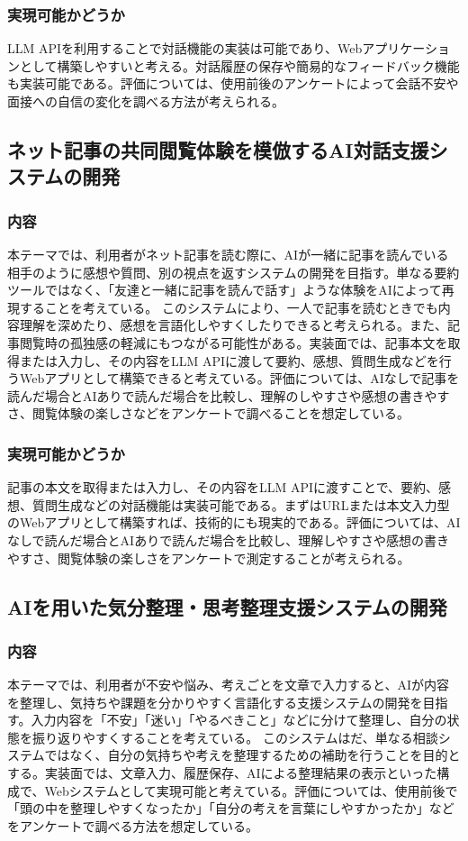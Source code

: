 \documentclass[a4paper,12pt]{ujarticle}
\begin{document}
\subsubsection{実現可能かどうか}
LLM APIを利用することで対話機能の実装は可能であり、Webアプリケーションとして構築しやすいと考える。対話履歴の保存や簡易的なフィードバック機能も実装可能である。評価については、使用前後のアンケートによって会話不安や面接への自信の変化を調べる方法が考えられる。

\subsection{ネット記事の共同閲覧体験を模倣するAI対話支援システムの開発}

\subsubsection{内容}

本テーマでは、利用者がネット記事を読む際に、AIが一緒に記事を読んでいる相手のように感想や質問、別の視点を返すシステムの開発を目指す。単なる要約ツールではなく、「友達と一緒に記事を読んで話す」ような体験をAIによって再現することを考えている。
このシステムにより、一人で記事を読むときでも内容理解を深めたり、感想を言語化しやすくしたりできると考えられる。また、記事閲覧時の孤独感の軽減にもつながる可能性がある。実装面では、記事本文を取得または入力し、その内容をLLM APIに渡して要約、感想、質問生成などを行うWebアプリとして構築できると考えている。評価については、AIなしで記事を読んだ場合とAIありで読んだ場合を比較し、理解のしやすさや感想の書きやすさ、閲覧体験の楽しさなどをアンケートで調べることを想定している。


\subsubsection{実現可能かどうか}
記事の本文を取得または入力し、その内容をLLM APIに渡すことで、要約、感想、質問生成などの対話機能は実装可能である。まずはURLまたは本文入力型のWebアプリとして構築すれば、技術的にも現実的である。評価については、AIなしで読んだ場合とAIありで読んだ場合を比較し、理解しやすさや感想の書きやすさ、閲覧体験の楽しさをアンケートで測定することが考えられる。
\subsection{AIを用いた気分整理・思考整理支援システムの開発}

\subsubsection{内容}
本テーマでは、利用者が不安や悩み、考えごとを文章で入力すると、AIが内容を整理し、気持ちや課題を分かりやすく言語化する支援システムの開発を目指す。入力内容を「不安」「迷い」「やるべきこと」などに分けて整理し、自分の状態を振り返りやすくすることを考えている。
このシステムはだ、単なる相談システムではなく、自分の気持ちや考えを整理するための補助を行うことを目的とする。実装面では、文章入力、履歴保存、AIによる整理結果の表示といった構成で、Webシステムとして実現可能と考えている。評価については、使用前後で「頭の中を整理しやすくなったか」「自分の考えを言葉にしやすかったか」などをアンケートで調べる方法を想定している。
\end{document}

